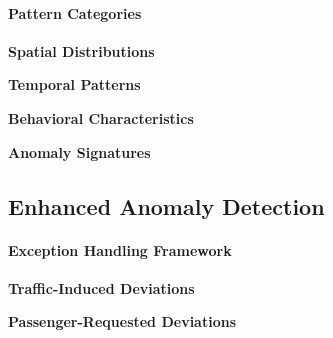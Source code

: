 \documentclass[runningheads]{llncs}
\begin{document}

\paragraph{Pattern Categories}

\textbf{Spatial Distributions}

\textbf{Temporal Patterns}

\textbf{Behavioral Characteristics}

\textbf{Anomaly Signatures}

\subsection{Enhanced Anomaly Detection}
\label{sec:improve}


\paragraph{Exception Handling Framework}

\textbf{Traffic-Induced Deviations}

\textbf{Passenger-Requested Deviations}
\end{document}
